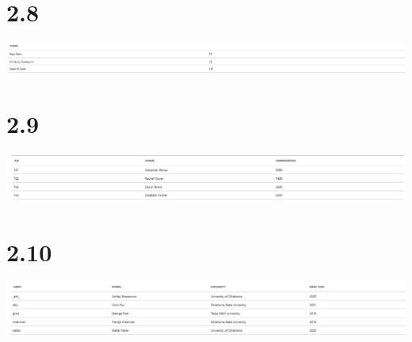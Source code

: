 \documentclass{article}
\begin{document}
\section{2.8}
\includegraphics[width=\textwidth]{img/query-outputs/2_8.JPG}
\section{2.9}
\includegraphics[width=\textwidth]{img/query-outputs/2_9.JPG}
\section{2.10}
\includegraphics[width=\textwidth]{img/query-outputs/2_10.JPG}
\end{document}
